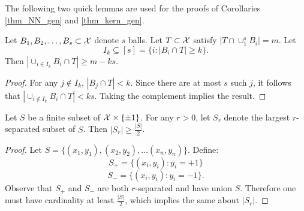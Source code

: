 The following two quick lemmas are used for the proofs of Corollaries \ref{thm_NN_gen} and \ref{thm_kern_gen}.

\begin{lem}\label{lem_point_count}
Let $B_1, B_2, \dots, B_s \subset \mathcal X$ denote $s$ balls. Let $T \subset \mathcal X$ satisfy $|T \cap \cup_1^s B_i| = m$. Let $$I_k \subseteq [s] = \{i: |B_i \cap T| \geq k\}.$$ Then $|\cup_{i \in I_k} B_i \cap T| \geq m - ks$. 
\end{lem}

\begin{proof}
For any $j \notin I_k$, $|B_j \cap T| < k$. Since there are at most $s$ such $j$, it follows that $|\cup_{i \notin I_k} B_i \cap T| < ks$. Taking the complement implies the result. 
\end{proof}

\begin{lem}\label{lem_half}
Let $S$ be a finite subset of $\mathcal X \times \{\pm 1\}$. For any $r > 0$, let $S_r$ denote the largest $r$-separated subset of $S$. Then $|S_r| \geq \frac{|S|}{2}$. 
\end{lem}

\begin{proof}
Let $S = \{(x_1, y_1), (x_2, y_2), \dots (x_n, y_n)\}$. 
Define: $$S_+ = \{(x_i, y_i): y_i = +1\}$$ $$S_- = \{(x_i, y_i): y_i = -1\}.$$ Observe that $S_+$ and $S_-$ are both $r$-separated and have union $S$. Therefore one must have cardinality at least $\frac{|S|}{2}$, which implies the same about $|S_r|$.
\end{proof}

